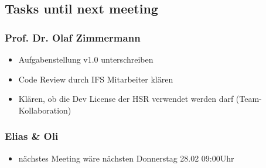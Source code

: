 \hypertarget{tasks-until-next-meeting}{%
\subsection*{Tasks until next meeting}\label{tasks-until-next-meeting}}

\hypertarget{prof-dr-olaf-zimmermann}{%
\subsubsection*{Prof. Dr. Olaf
Zimmermann}\label{prof-dr-olaf-zimmermann}}

\begin{itemize}
\item
  Aufgabenstellung v1.0 unterschreiben
\item
  Code Review durch IFS Mitarbeiter klären
\item
  Klären, ob die Dev License der HSR verwendet werden darf
  (Team-Kollaboration)
\end{itemize}

\hypertarget{elias--oli}{%
\subsubsection*{Elias \& Oli}\label{elias--oli}}

\begin{itemize}
\item
  nächstes Meeting wäre nächsten Donnerstag 28.02 09:00Uhr
\end{itemize}